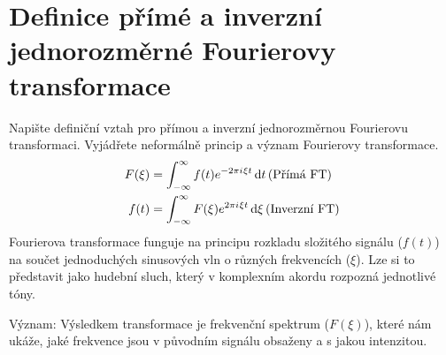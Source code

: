 \section{Definice přímé a inverzní jednorozměrné Fourierovy transformace}
Napište definiční vztah pro přímou a inverzní jednorozměrnou Fourierovu transformaci. Vyjádřete neformálně 
princip a význam Fourierovy transformace.
\begin{align}
    F(\xi) &= \int_{-\infty}^{\infty}f(t)e^{-2 \pi {i\mkern1mu} \xi t} \mathop{}\!\mathrm{d} t \, (\text{Přímá FT})\\
    f(t) &= \int_{-\infty}^{\infty}F(\xi)e^{2 \pi {i\mkern1mu} \xi t} \mathop{}\!\mathrm{d} \xi \, (\text{Inverzní FT})
\end{align}
Fourierova transformace funguje na principu rozkladu složitého signálu ($f(t)$) na součet jednoduchých sinusových vln o 
různých frekvencích ($\xi$). Lze si to představit jako hudební sluch, který v komplexním akordu rozpozná jednotlivé 
tóny.

Význam: Výsledkem transformace je frekvenční spektrum ($F(\xi)$), které nám ukáže, jaké frekvence jsou v původním 
signálu obsaženy a s jakou intenzitou.
